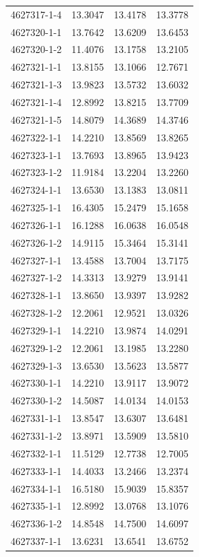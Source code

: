 \begin{longtable}{lrrr}
4627317-1-4 & 13.3047 & 13.4178 & 13.3778 \\
4627320-1-1 & 13.7642 & 13.6209 & 13.6453 \\
4627320-1-2 & 11.4076 & 13.1758 & 13.2105 \\
4627321-1-1 & 13.8155 & 13.1066 & 12.7671 \\
4627321-1-3 & 13.9823 & 13.5732 & 13.6032 \\
4627321-1-4 & 12.8992 & 13.8215 & 13.7709 \\
4627321-1-5 & 14.8079 & 14.3689 & 14.3746 \\
4627322-1-1 & 14.2210 & 13.8569 & 13.8265 \\
4627323-1-1 & 13.7693 & 13.8965 & 13.9423 \\
4627323-1-2 & 11.9184 & 13.2204 & 13.2260 \\
4627324-1-1 & 13.6530 & 13.1383 & 13.0811 \\
4627325-1-1 & 16.4305 & 15.2479 & 15.1658 \\
4627326-1-1 & 16.1288 & 16.0638 & 16.0548 \\
4627326-1-2 & 14.9115 & 15.3464 & 15.3141 \\
4627327-1-1 & 13.4588 & 13.7004 & 13.7175 \\
4627327-1-2 & 14.3313 & 13.9279 & 13.9141 \\
4627328-1-1 & 13.8650 & 13.9397 & 13.9282 \\
4627328-1-2 & 12.2061 & 12.9521 & 13.0326 \\
4627329-1-1 & 14.2210 & 13.9874 & 14.0291 \\
4627329-1-2 & 12.2061 & 13.1985 & 13.2280 \\
4627329-1-3 & 13.6530 & 13.5623 & 13.5877 \\
4627330-1-1 & 14.2210 & 13.9117 & 13.9072 \\
4627330-1-2 & 14.5087 & 14.0134 & 14.0153 \\
4627331-1-1 & 13.8547 & 13.6307 & 13.6481 \\
4627331-1-2 & 13.8971 & 13.5909 & 13.5810 \\
4627332-1-1 & 11.5129 & 12.7738 & 12.7005 \\
4627333-1-1 & 14.4033 & 13.2466 & 13.2374 \\
4627334-1-1 & 16.5180 & 15.9039 & 15.8357 \\
4627335-1-1 & 12.8992 & 13.0768 & 13.1076 \\
4627336-1-2 & 14.8548 & 14.7500 & 14.6097 \\
4627337-1-1 & 13.6231 & 13.6541 & 13.6752 \\

\end{longtable}
